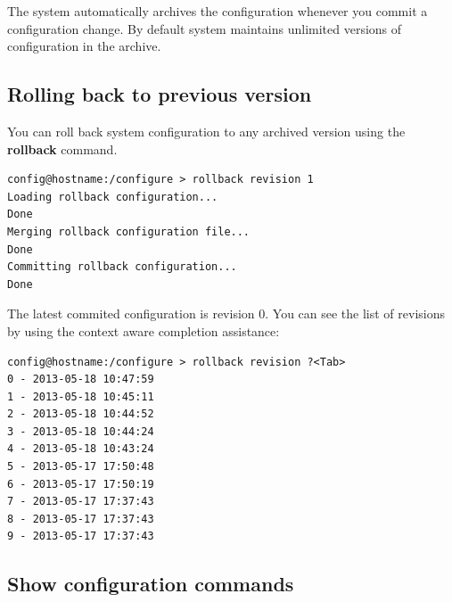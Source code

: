 \documentclass[a4paper,latin]{paper}
\begin{document}
The system automatically archives the configuration whenever you commit a configuration
change. By default system maintains unlimited versions of configuration in the archive.

\subsection{Rolling back to previous version}

You can roll back system configuration to any archived version using the \textbf{rollback} command.
\begin{lstlisting}[style=BashInputStyle]
config@hostname:/configure > rollback revision 1
Loading rollback configuration...
Done
Merging rollback configuration file...
Done
Committing rollback configuration...
Done
\end{lstlisting}
The latest commited configuration is revision 0. You can see the list of revisions by using the
context aware completion assistance:
\begin{lstlisting}[style=BashInputStyle]
config@hostname:/configure > rollback revision ?<Tab>
0 - 2013-05-18 10:47:59
1 - 2013-05-18 10:45:11
2 - 2013-05-18 10:44:52
3 - 2013-05-18 10:44:24
4 - 2013-05-18 10:43:24
5 - 2013-05-17 17:50:48
6 - 2013-05-17 17:50:19
7 - 2013-05-17 17:37:43
8 - 2013-05-17 17:37:43
9 - 2013-05-17 17:37:43
\end{lstlisting}

\subsection{Show configuration commands}
\end{document}
